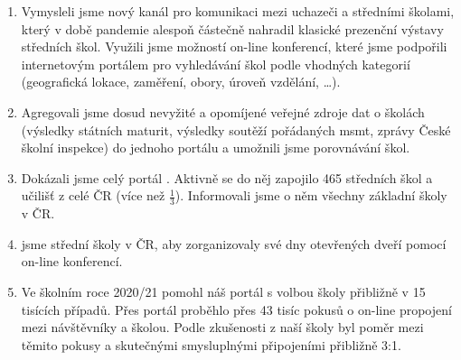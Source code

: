 \begin{enumerate}
  \item Vymysleli jsme nový kanál pro komunikaci mezi uchazeči a středními školami, který v době pandemie alespoň částečně nahradil klasické prezenční výstavy středních škol.
    Využili jsme možností on-line konferencí, které jsme podpořili internetovým portálem pro vyhledávání škol podle vhodných kategorií (geografická lokace, zaměření, obory, úroveň vzdělání, \ldots).

  \item Agregovali jsme dosud nevyžité a opomíjené veřejné zdroje dat o školách (výsledky státních maturit, výsledky soutěží pořádaných \acrshort{msmt}, zprávy České školní inspekce)
    do  jednoho portálu a umožnili jsme porovnávání škol.

  \item Dokázali jsme celý portál . Aktivně se do něj zapojilo 465 středních škol a učilišť z celé ČR (více než \(\frac{1}{3}\)).
    Informovali jsme o něm všechny základní školy v ČR.

  \item {} jsme střední školy v ČR, aby zorganizovaly své dny otevřených dveří pomocí on-line konferencí.
  \item Ve školním roce 2020/21 pomohl náš portál s volbou školy přibližně v 15 tisících případů. 
    Přes portál proběhlo přes 43 tisíc pokusů o on-line propojení mezi návštěvníky a školou.
    Podle zkušenosti z naší školy byl poměr mezi těmito pokusy a skutečnými smysluplnými připojeními přibližně 3:1. 

\end{enumerate}


